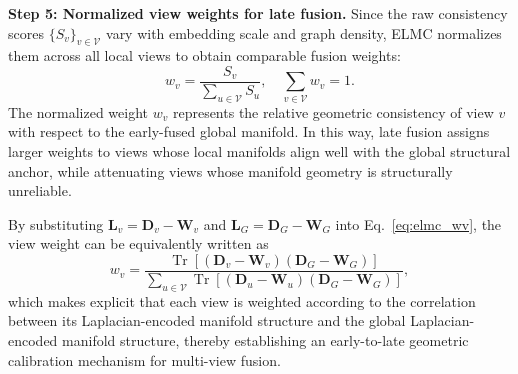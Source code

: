 \documentclass[10pt, journal, compsoc]{IEEEtran}
\begin{document}
\textbf{Step 5: Normalized view weights for late fusion.}
Since the raw consistency scores $\{S_v\}_{v\in\mathcal{V}}$ vary with embedding scale and graph density, ELMC normalizes them across all local views to obtain comparable fusion weights:
\begin{equation}
w_v
=
\frac{S_v}
{\sum_{u\in\mathcal{V}}S_u},
\quad
\sum_{v\in\mathcal{V}}w_v=1.
\label{eq:elmc_wv}
\end{equation}
The normalized weight $w_v$ represents the relative geometric consistency of view $v$ with respect to the early-fused global manifold. In this way, late fusion assigns larger weights to views whose local manifolds align well with the global structural anchor, while attenuating views whose manifold geometry is structurally unreliable.

By substituting $\mathbf{L}_{v}=\mathbf{D}_{v}-\mathbf{W}_{v}$ and $\mathbf{L}_{G}=\mathbf{D}_{G}-\mathbf{W}_{G}$ into Eq.~\eqref{eq:elmc_wv}, the view weight can be equivalently written as
\begin{equation}
w_v
=
\frac{
\operatorname{Tr}
\left[
\left(\mathbf{D}_{v}-\mathbf{W}_{v}\right)
\left(\mathbf{D}_{G}-\mathbf{W}_{G}\right)
\right]
}{
\sum_{u\in\mathcal{V}}
\operatorname{Tr}
\left[
\left(\mathbf{D}_{u}-\mathbf{W}_{u}\right)
\left(\mathbf{D}_{G}-\mathbf{W}_{G}\right)
\right]
},
\label{eq:weight_computation}
\end{equation}
which makes explicit that each view is weighted according to the correlation between its Laplacian-encoded manifold structure and the global Laplacian-encoded manifold structure, thereby establishing an early-to-late geometric calibration mechanism for multi-view fusion.
\end{document}
